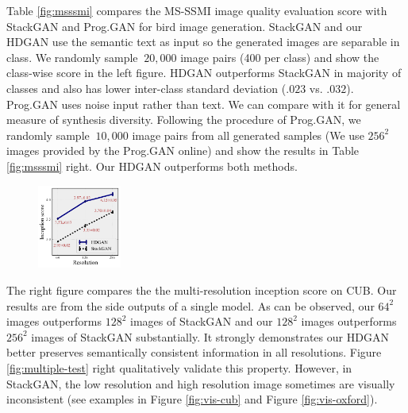 \documentclass[10pt,twocolumn,letterpaper]{article}
\begin{document}
Table \ref{fig:msssmi} compares the MS-SSMI image quality evaluation score with StackGAN and Prog.GAN for bird image generation. StackGAN and our HDGAN use the semantic text as input so the generated images are separable in class. We randomly sample ${~}20,000$ image pairs (400 per class) and show the class-wise score in the left figure. HDGAN outperforms StackGAN in majority of classes and also has lower inter-class standard deviation ($.023$ vs. $.032$).
Prog.GAN uses noise input rather than text. We can compare with it for general measure of synthesis diversity. Following the procedure of Prog.GAN, we randomly sample ${~}10,000$ image pairs from all generated samples (We use $256^2$ images provided by the Prog.GAN online) and show the results in Table \ref{fig:msssmi} right. Our HDGAN outperforms both methods. 


\begingroup
\setlength{\intextsep}{-4pt}%
\setlength{\columnsep}{0pt}%
\begin{figure}
	\centering
	\includegraphics[width=0.245\textwidth]{figure/multiscale_inception_2.pdf}
	\vspace{-12pt}
\end{figure}
The right figure compares the the multi-resolution inception score on CUB. Our results are from the side outputs of a single model. As can be observed, our $64^2$ images outperforms $128^2$ images of StackGAN and our $128^2$ images outperforms $256^2$ images of StackGAN substantially. It strongly demonstrates our HDGAN better preserves semantically consistent information in all resolutions. Figure \ref{fig:multiple-test}  right qualitatively validate this property. However, in StackGAN, the low resolution and high resolution image sometimes are visually inconsistent (see examples in Figure \ref{fig:vis-cub} and Figure \ref{fig:vis-oxford}).
\end{document}
